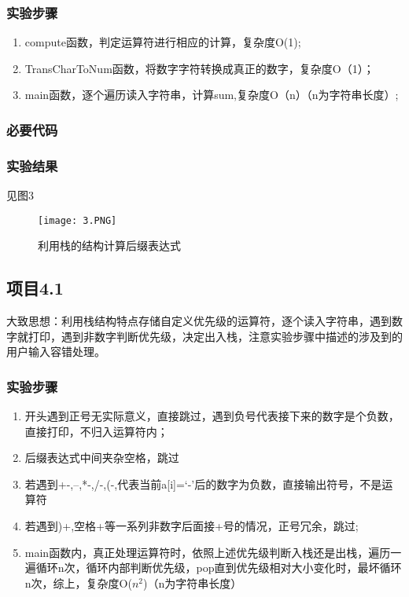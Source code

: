 \subsubsection{实验步骤}
\begin{enumerate}
\item compute函数，判定运算符进行相应的计算，复杂度O(1);
\item TransCharToNum函数，将数字字符转换成真正的数字，复杂度O（1）；
\item main函数，逐个遍历读入字符串，计算sum,复杂度O（n）（n为字符串长度）;
\end{enumerate}
\subsubsection{必要代码}

\subsubsection{实验结果}见图3
	\begin{figure}[!bthp]
	\centering
        \texttt{[image: 3.PNG]}
        \caption{利用栈的结构计算后缀表达式}
      \end{figure}


\subsection{项目4.1}
大致思想：利用栈结构特点存储自定义优先级的运算符，逐个读入字符串，遇到数字就打印，遇到非数字判断优先级，决定出入栈，注意实验步骤中描述的涉及到的用户输入容错处理。
\subsubsection{实验步骤}
\begin{enumerate}
\item 开头遇到正号无实际意义，直接跳过，遇到负号代表接下来的数字是个负数，直接打印，不归入运算符内；
\item 后缀表达式中间夹杂空格，跳过
\item 若遇到+-,--,*-,/-,(-,代表当前a[i]=‘-’后的数字为负数，直接输出符号，不是运算符
\item 若遇到)+,空格+等一系列非数字后面接+号的情况，正号冗余，跳过;
\item main函数内，真正处理运算符时，依照上述优先级判断入栈还是出栈，遍历一遍循环n次，循环内部判断优先级，pop直到优先级相对大小变化时，最坏循环n次，综上，复杂度O($n^2$)（n为字符串长度）
\end{enumerate}
